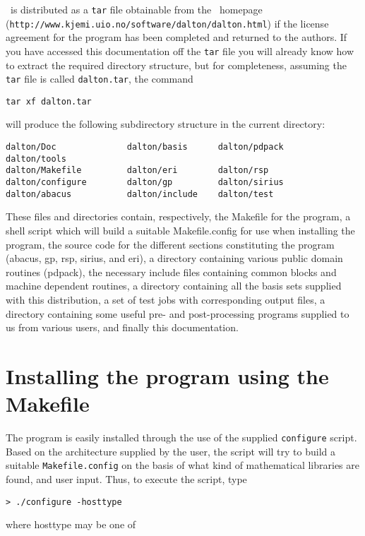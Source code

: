          \siraba\ is distributed as a \verb|tar| file obtainable from
the \siraba\ homepage\\
(\verb|http://www.kjemi.uio.no/software/dalton/dalton.html|) if the license
agreement for the program has been completed and returned to the
authors.  If you 
have accessed this documentation off the \verb|tar|
file you will 
already know how to extract the required directory structure, but
for completeness, assuming the \verb|tar| file is called
\verb|dalton.tar|, the command
\begin{verbatim}
tar xf dalton.tar
\end{verbatim}
will produce the following subdirectory structure in the current
directory:
\begin{verbatim}
dalton/Doc              dalton/basis      dalton/pdpack     dalton/tools
dalton/Makefile         dalton/eri        dalton/rsp
dalton/configure        dalton/gp         dalton/sirius 
dalton/abacus           dalton/include    dalton/test
\end{verbatim}
These files and directories contain, respectively, the Makefile for
the program, a shell script which will build a suitable
Makefile.config for use when installing the program, the 
source  code for the different sections constituting the program
(abacus, gp, rsp, sirius, and eri), a directory containing
various public domain routines (pdpack), the necessary include files
containing common blocks and  
machine dependent routines, a directory containing all the basis sets
supplied with this distribution, a set of test jobs with corresponding
output files, a directory containing some useful pre- and
post-processing programs supplied to us from various users, and
finally this documentation.  

\section{Installing the program using the Makefile}\label{sec:Makefile}

The program is easily installed through the use of the supplied
\verb|configure| script. Based on the
architecture supplied by the user, the 
script will try to build a suitable
\verb|Makefile.config| on the 
basis of what kind of mathematical libraries are found, and user
input. Thus, to execute the script, type

\begin{verbatim}
> ./configure -hosttype
\end{verbatim}
where hosttype may be one of

